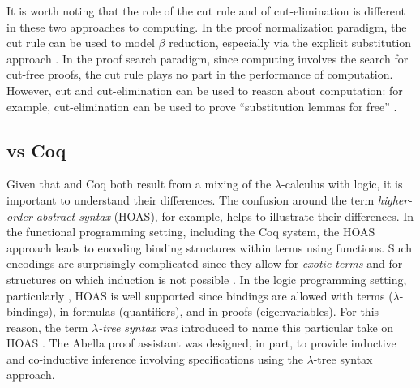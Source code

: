 It is worth noting that the role of the cut rule and of
cut-elimination is different in these two approaches to computing.
In the proof normalization paradigm, the cut rule can be used to model
$\beta$ reduction, especially via the explicit substitution approach
\cite{lengrand06phd}. In the proof search paradigm, since computing involves
the search for cut-free proofs, the cut rule plays no part in the
performance of computation.  However, cut and cut-elimination can be
used to reason about computation: for example, cut-elimination can be
used to prove ``substitution lemmas for free'' \cite{gacek12jar}.




\subsection{\lP vs Coq}

Given that \lP and Coq both result from a mixing of the
$\lambda$-calculus with logic, it is important to understand their
differences.  The confusion around the term \emph{higher-order
abstract syntax} (HOAS), for example, helps to illustrate their
differences.  In the functional programming setting, including the Coq
system, the HOAS approach leads to encoding binding structures within
terms using functions.  Such encodings are surprisingly complicated
since they allow for \emph{exotic terms} \cite{despeyroux95tlca} and
for structures on which induction is not possible
\cite{roeckl01fossacs}.  In the logic programming setting,
particularly \lP, HOAS is well supported since bindings are allowed
with terms ($\lambda$-bindings), in formulas (quantifiers), and in
proofs (eigenvariables).  For this reason, the term
\emph{$\lambda$-tree syntax} was introduced to name this particular
take on HOAS \cite{miller19jar}.  The Abella proof assistant
\cite{baelde14jfr} was designed, in part, to provide inductive and
co-inductive inference involving specifications using the
$\lambda$-tree syntax approach.

